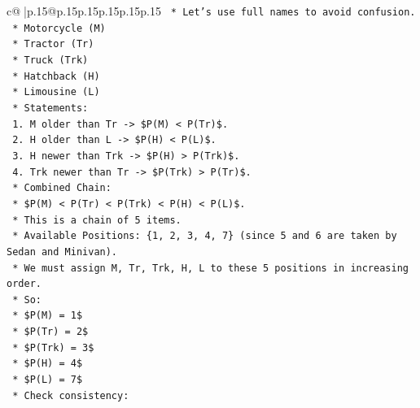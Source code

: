 \documentclass{article}
\begin{document}
{\begin{supertabular}{c@{$\;$}|p{.15\linewidth}@{}p{.15\linewidth}p{.15\linewidth}p{.15\linewidth}p{.15\linewidth}p{.15\linewidth}}
{{{\texttt{                            *   Let's use full names to avoid confusion.} \\
\texttt{                                *   Motorcycle (M)} \\
\texttt{                                *   Tractor (Tr)} \\
\texttt{                                *   Truck (Trk)} \\
\texttt{                                *   Hatchback (H)} \\
\texttt{                                *   Limousine (L)} \\
\texttt{                            *   Statements:} \\
\texttt{                                1.  M older than Tr {-}> \$P(M) < P(Tr)\$.} \\
\texttt{                                2.  H older than L {-}> \$P(H) < P(L)\$.} \\
\texttt{                                3.  H newer than Trk {-}> \$P(H) > P(Trk)\$.} \\
\texttt{                                4.  Trk newer than Tr {-}> \$P(Trk) > P(Tr)\$.} \\
\texttt{                            *   Combined Chain:} \\
\texttt{                                *   \$P(M) < P(Tr) < P(Trk) < P(H) < P(L)\$.} \\
\texttt{                                *   This is a chain of 5 items.} \\
\texttt{                            *   Available Positions: \{1, 2, 3, 4, 7\} (since 5 and 6 are taken by Sedan and Minivan).} \\
\texttt{                            *   We must assign M, Tr, Trk, H, L to these 5 positions in increasing order.} \\
\texttt{                            *   So:} \\
\texttt{                                *   \$P(M) = 1\$} \\
\texttt{                                *   \$P(Tr) = 2\$} \\
\texttt{                                *   \$P(Trk) = 3\$} \\
\texttt{                                *   \$P(H) = 4\$} \\
\texttt{                                *   \$P(L) = 7\$} \\
\texttt{                            *   Check consistency:} \\
}}}
\end{supertabular}}
\end{document}
